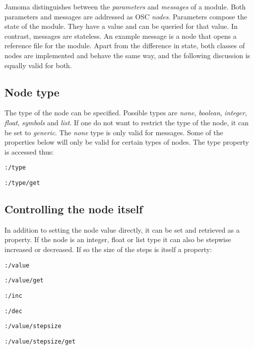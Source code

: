 \documentclass{sig-alternate}
\begin{document}
Jamoma distinguishes between the \emph{parameters} and \emph{messages} of a module.  Both parameters and messages are addressed as OSC \emph{nodes}.  Parameters compose the state of the module.  They have a value and can be queried for that value. In contrast, messages are stateless. An example message is a node that opens a reference file for the module. Apart from the difference in state, both classes of nodes are implemented and behave the same way, and the following discussion is equally valid for both. 



\subsection{Node type} %
\label{sub:type}

The type of the node can be specified. Possible types are \emph{none}, \emph{boolean}, \emph{integer}, \emph{float}, \emph{symbols} and \emph{list}. If one do not want to restrict the type of the node, it can be set to \emph{generic}. The \emph{none} type is only valid for messages. Some of the properties below will only be valid for certain types of nodes. The type property is accessed thus:

\texttt{:/type}

\texttt{:/type/get}





\subsection{Controlling the node itself} %
\label{sub:controlling_the_node_itself}

In addition to setting the node value directly, it can be set and retrieved as a property. If the node is an integer, float or list type it can also be stepwise increased or decreased. If so the size of the steps is itself a property:

\texttt{:/value}

\texttt{:/value/get}

\texttt{:/inc}

\texttt{:/dec} 

\texttt{:/value/stepsize}

\texttt{:/value/stepsize/get}

\end{document}

